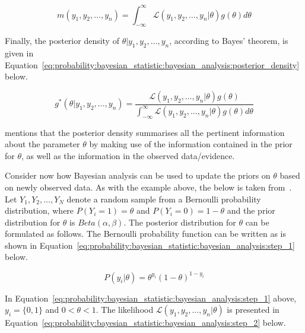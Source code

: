 \begin{equation}
      \label{eq:probability:bayesian_statistic:bayesian_analysis:marginal_density}
      m(y_{1}, y_{2}, \dots, y_{n}) = \int_{-\infty}^{\infty} \mathcal{L}(y_{1}, y_{2}, \dots, y_{n} \vert \theta)g(\theta)d\theta
\end{equation}

Finally, the posterior density of $\theta \vert y_{1}, y_{2}, \dots, y_{n}$, according to Bayes' theorem, is given in Equation~\eqref{eq:probability:bayesian_statistic:bayesian_analysis:posterior_density} below.

\begin{equation}
      \label{eq:probability:bayesian_statistic:bayesian_analysis:posterior_density}
      g^{*}(\theta \vert y_{1}, y_{2}, \dots, y_{n}) = \frac{\mathcal{L}(y_{1}, y_{2}, \dots, y_{n} \vert \theta)g(\theta)}{\int_{-\infty}^{\infty} \mathcal{L}(y_{1}, y_{2}, \dots, y_{n} \vert \theta)g(\theta)d\theta}
\end{equation}

\citeauthor{ref:wackerly:2014}\cite{ref:wackerly:2014} mentions that the posterior density summarises all the pertinent information about the parameter $\theta$ by making use of the information contained in the prior for $\theta$, as well as the information in the observed data/evidence.

Consider now how Bayesian analysis can be used to update the priors on $\theta$ based on newly observed data. As with the example above, the below is taken from~\cite{ref:wackerly:2014}. Let $Y_{1}, Y_{2}, \dots, Y_{N}$ denote a random sample from a Bernoulli probability distribution, where $P(Y_{i} = 1) = \theta$ and $P(Y_{i} = 0) = 1 - \theta$ and the prior distribution for $\theta$ is $Beta(\alpha, \beta)$. The posterior distribution for $\theta$ can be formulated as follows. The Bernoulli probability function can be written as is shown in Equation~\eqref{eq:probability:bayesian_statistic:bayesian_analysis:step_1} below.

\begin{equation}
      \label{eq:probability:bayesian_statistic:bayesian_analysis:step_1}
      P(y_{i} \vert \theta) = \theta^{y_{i}}(1 - \theta)^{1-y_{i}}
\end{equation}

In Equation~\eqref{eq:probability:bayesian_statistic:bayesian_analysis:step_1} above, $y_{i} = \{0,1\}$ and $0 < \theta < 1$. The likelihood $\mathcal{L}(y_{1}, y_{2}, \dots, y_{n} \vert \theta)$ is presented in Equation~\eqref{eq:probability:bayesian_statistic:bayesian_analysis:step_2} below.

